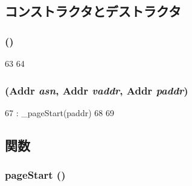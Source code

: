 \subsection{コンストラクタとデストラクタ}
\hypertarget{structPowerISA_1_1TlbEntry_ad069716fb78ffaa2d9bfba679a8eac9a}{
\subsubsection[{TlbEntry}]{ ()}}
\label{structPowerISA_1_1TlbEntry_ad069716fb78ffaa2d9bfba679a8eac9a}



\begin{DoxyCode}
63     {
64     }
\end{DoxyCode}
\hypertarget{structPowerISA_1_1TlbEntry_a69a4824fbe38adbd1517dda05272617d}{
\subsubsection[{TlbEntry}]{ ({\bf Addr} {\em asn}, \/  {\bf Addr} {\em vaddr}, \/  {\bf Addr} {\em paddr})}}
\label{structPowerISA_1_1TlbEntry_a69a4824fbe38adbd1517dda05272617d}



\begin{DoxyCode}
67         : _pageStart(paddr)
68     {
69     }
\end{DoxyCode}


\subsection{関数}
\hypertarget{structPowerISA_1_1TlbEntry_a4f87fae41ff4bd27577a41dba3cf2b90}{
\subsubsection[{pageStart}]{ pageStart ()}}
\label{structPowerISA_1_1TlbEntry_a4f87fae41ff4bd27577a41dba3cf2b90}



